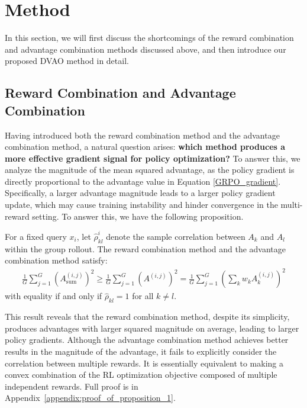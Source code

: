 \documentclass{llmxive}
\begin{document}
\section{Method}
In this section, we will first discuss the shortcomings of the reward combination and advantage combination methods discussed above, and then introduce our proposed DVAO method in detail.

\subsection{Reward Combination and Advantage Combination}
Having introduced both the reward combination method and the advantage combination method, a natural question arises: \textbf{which method produces a more effective gradient signal for policy optimization?} To answer this, we analyze the magnitude of the mean squared advantage, as the policy gradient is directly proportional to the advantage value in Equation \ref{GRPO_gradient}. Specifically, a larger advantage magnitude leads to a larger policy gradient update, which may cause training instability and hinder convergence in the multi-reward setting. To answer this, we have the following proposition.

\begin{proposition}
    For a fixed query $x_i$, let $\hat{\rho}_{kl}^i$ denote the sample correlation between $A_k$ and $A_l$ within the group rollout. The reward combination method and the advantage combination method satisfy:
    \begin{align}
        \frac{1}{G} \sum_{j=1}^G \left(A_\text{sum}^{(i,j)}\right)^2 \ge \frac{1}{G} \sum_{j=1}^G \left(A^{(i,j)}\right)^2 = \frac{1}{G} \sum_{j=1}^G \left(\sum_k w_k A_k^{(i,j)}\right)^2
    \end{align}
    with equality if and only if $\hat{\rho}_{kl}=1$ for all $k \neq l$.
\end{proposition}

This result reveals that the reward combination method, despite its simplicity, produces advantages with larger squared magnitude on average, leading to larger policy gradients. Although the advantage combination method achieves better results in the magnitude of the advantage, it fails to explicitly consider the correlation between multiple rewards. It is essentially equivalent to making a convex combination of the RL optimization objective composed of multiple independent rewards. Full proof is in Appendix~\ref{appendix:proof_of_proposition_1}.
\end{document}
